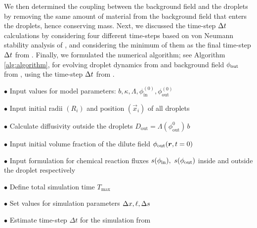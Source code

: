 We then determined the coupling between the background field and the droplets by removing the same amount of material from the background field that enters the droplets, hence conserving mass.
Next, we discussed the time-step $\Delta t$ calculations by considering four different time-steps based on von Neumann stability analysis of , and considering the minimum of them as the final time-step $\Delta t$ from .
Finally, we formulated the numerical algorithm; see Algorithm \ref{alg:algorithm}, for evolving droplet dynamics from  and background field $\phi_\mathrm{out}$ from , using the time-step $\Delta t$ from .

\newpage

\begin{algorithm}

\label{alg:algorithm}

$\bullet$ Input values for model parameters: $b, \kappa, \Lambda, \phi^{(0)}_\mathrm{in}, \phi^{(0)}_\mathrm{out}$\;

$\bullet$ Input initial radii $(R_i)$ and position $(\vec{x}_i)$ of all droplets\;

$\bullet$ Calculate diffusivity outside the droplets $D_\mathrm{out} = \Lambda(\phi^0_\mathrm{out}) \, b$\;

$\bullet$ Input initial volume fraction of the dilute field $\phi_\mathrm{out}(\boldsymbol{r}, t=0)$\;

$\bullet$ Input formulation for chemical reaction fluxes $s(\phi_\mathrm{in}),~s(\phi_\mathrm{out})$ inside and outside the droplet respectively\;

$\bullet$ Define total simulation time $T_\mathrm{max}$\;

$\bullet$ Set values for simulation parameters $\Delta x, \ell, \Delta s$\;

{
    $\bullet$ Estimate time-step $\Delta t$ for the simulation from \;
}
\end{algorithm}
